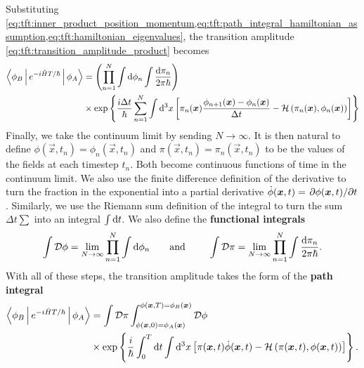 Substituting \cref{eq:tft:inner_product_position_momentum,eq:tft:path_integral_hamiltonian_assumption,eq:tft:hamiltonian_eigenvalues}, the transition amplitude \eqref{eq:tft:transition_amplitude_product} becomes
\begin{equation}
\begin{split}
	\Braket{\phi_B | e^{- i \hat{H} T / \hbar} | \phi_A} &=      \left( \prod_{n=1}^N \int \mathop{}\!\mathrm{d} \phi_n \int \frac{\mathop{}\!\mathrm{d} \pi_n}{2 \pi \hbar} \right) \\
	           &\times \exp \left\{ \frac{i \Delta t}{\hbar} \sum_{n=1}^N \int \mathop{}\!\mathrm{d}^3 x \left[ \pi_n({\bm{x}}) \frac{\phi_{n+1}({\bm{x}}) - \phi_n({\bm{x}})}{\Delta t} - \mathcal{H} \left( \pi_n({\bm{x}}), \phi_n({\bm{x}}) \right) \right]
	\right\}
\end{split}
\end{equation}
Finally, we take the continuum limit by sending $N \rightarrow \infty$.
It is then natural to define
$\phi(\vec{x}, t_n) = \phi_n(\vec{x}, t_n)$
and
$\pi(\vec{x}, t_n) = \pi_n(\vec{x}, t_n)$
to be the values of the fields at each timestep $t_n$.
Both become continuous functions of time in the continuum limit.
We also use the finite difference definition of the derivative to turn the fraction in the exponential into a partial derivative $\dot{\phi}({\bm{x}},t) = \pdv{\phi({\bm{x}},t)}/{t}$.
Similarly, we use the Riemann sum definition of the integral to turn the sum $\Delta t\sum$ into an integral $\int \mathop{}\!\mathrm{d} t$.
We also define the \textbf{functional integrals}
\begin{equation}
	\int \pathintdif \phi = \lim_{N \rightarrow \infty} \prod_{n=1}^{N} \int \dif \phi_n
	\qquad \text{and} \qquad
	\int \pathintdif \pi = \lim_{N \rightarrow \infty} \prod_{n=1}^{N} \int \frac{\dif \pi_n}{2 \pi \hbar} .
\label{eq:tft:functional_integral}
\end{equation}
With all of these steps, the transition amplitude takes the form of the \textbf{path integral}
\begin{equation}
\begin{split}
	\Braket{\phi_B | e^{- i \hat{H} T / \hbar} | \phi_A} &=      \int \mathcal{D} \pi \int_{\phi({\bm{x}}, 0)=\phi_A({\bm{x}})}^{\phi({\bm{x}},T)=\phi_B({\bm{x}})} \mathcal{D} \phi \\
	           &\times \exp \left\{ \frac{i}{\hbar} \int_0^T \mathop{}\!\mathrm{d} t \int \mathop{}\!\mathrm{d}^3 x \left[ \pi({\bm{x}}, t) \dot{\phi}({\bm{x}}, t) - \mathcal{H} \left( \pi({\bm{x}}, t), \phi({\bm{x}}, t) \right) \right] \right\} .
\end{split}
\label{eq:tft:path_integral_hamiltonian}
\end{equation}

